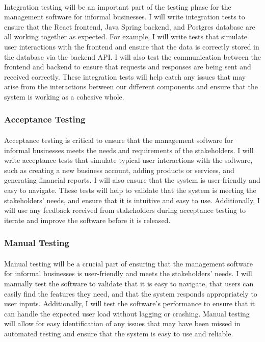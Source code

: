 \documentclass{article}
\begin{document}
\paragraph*{}
Integration testing will be an important part of the testing phase for the management software for informal businesses. I will write integration tests to ensure that the React frontend, Java Spring backend, and Postgres database are all working together as expected. For example, I will write tests that simulate user interactions with the frontend and ensure that the data is correctly stored in the database via the backend API. I will also test the communication between the frontend and backend to ensure that requests and responses are being sent and received correctly. These integration tests will help catch any issues that may arise from the interactions between our different components and ensure that the system is working as a cohesive whole.

\subsubsection{Acceptance Testing}
\paragraph*{}
Acceptance testing is critical to ensure that the management software for informal businesses meets the needs and requirements of the stakeholders. I will write acceptance tests that simulate typical user interactions with the software, such as creating a new business account, adding products or services, and generating financial reports. I will also ensure that the system is user-friendly and easy to navigate. These tests will help to validate that the system is meeting the stakeholders' needs, and ensure that it is intuitive and easy to use. Additionally, I will use any feedback received from stakeholders during acceptance testing to iterate and improve the software before it is released.

\subsubsection{Manual Testing}
\paragraph*{}
Manual testing will be a crucial part of ensuring that the management software for informal businesses is user-friendly and meets the stakeholders' needs. I will manually test the software to validate that it is easy to navigate, that users can easily find the features they need, and that the system responds appropriately to user inputs. Additionally, I will test the software's performance to ensure that it can handle the expected user load without lagging or crashing. Manual testing will allow for easy identification of any issues that may have been missed in automated testing and ensure that the system is easy to use and reliable.
\end{document}
